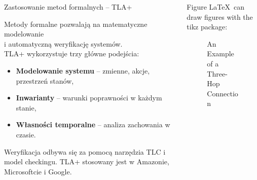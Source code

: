 \documentclass{purdue-poster}
\begin{document}
\begin{frame}{}
\begin{columns}[c]
\begin{column}{.48\linewidth}
\begin{block}{Zastosowanie metod formalnych – TLA+}
\begin{minipage}[c]{0.35\textwidth}
            \vspace{0.5cm}
        \end{minipage}
        \hfill
        \begin{minipage}[c]{0.6\textwidth}
        Metody formalne pozwalają na matematyczne modelowanie\\ i automatyczną weryfikację systemów.\\  
        TLA+ wykorzystuje trzy główne podejścia:
        \begin{itemize}
            \item \textbf{Modelowanie systemu} – zmienne, akcje, przestrzeń stanów,
            \item \textbf{Inwarianty} – warunki poprawności w każdym stanie,
            \item \textbf{Własności temporalne} – analiza zachowania w czasie.
        \end{itemize}
        Weryfikacja odbywa się za pomocą narzędzia TLC i model checkingu. TLA+ stosowany jest w Amazonie, Microsoftcie i Google.
        \end{minipage}
    \end{block}

    \end{column}

    \begin{column}{.48\linewidth}
    
    \begin{block}{Figure}
        \LaTeX\ can draw figures with the tikz package:
        \begin{figure}[h]
        \centering
        \caption{An Example of a Three-Hop Connection}
        \label{fig:three-hop}
        \end{figure}
    \end{block}


\end{column}
\end{columns}
\end{frame}
\end{document}
